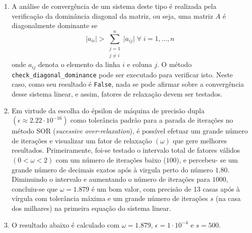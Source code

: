 \documentclass{article}
\newenvironment{arabenum}{
    \begin{enumerate}[label=\textbf{\arabic*})]
}{
    \end{enumerate}
}
\newenvironment{alphenum}{
    \begin{enumerate}[label=(\textit{\alph*})]
}{
    \end{enumerate}
}
\begin{document}
\begin{arabenum}
\begin{alphenum}
\item A análise de convergência de um sistema deste tipo é realizada pela
verificação da dominância diagonal da matriz, ou seja, uma matriz $A$ é
diagonalmente dominante se
\begin{equation*}
\vert a_{ii} \vert > \sum_{\substack{j=1 \\ j \neq i}}^n \vert a_{ij} \vert
\; \forall \; i = 1, \dots, n
\end{equation*}
onde $a_{ij}$ denota o elemento da linha $i$ e coluna $j$. O método
\texttt{check\_diagonal\_dominance} pode ser executado para verificar isto.
Neste caso, como seu resultado é \verb!False!, nada se pode afirmar sobre a
convergência desse sistema linear, e assim, fatores de relaxação devem ser
testados.

\item Em virtude da escolha do épsilon de máquina de precisão dupla $(\epsilon
\approx 2.22 \cdot 10^{-16})$ como tolerância padrão para a parada de iterações
no método SOR (\emph{sucessive over-relaxation}), é possível efetuar um grande
número de iterações e visualizar um fator de relaxação $(\omega)$ que gere
melhores resultados. Primeiramente, foi-se testado o intervalo total de fatores
válidos $(0 < \omega < 2)$ com um número de iterações baixo ($100$), e percebeu-
se um grande número de decimais exatos após à virgula perto do número
$\boldsymbol{1.80}$. Diminuindo o intervalo e aumentando o número de iterações
para $1000$, concluiu-se que $\omega = \boldsymbol{1.879}$ é um bom valor, com
precisão de 13 casas após à vírgula com tolerância máxima e um grande número de
iterações $s$ (na casa dos milhares) na primeira equação do sistema linear.

\item O resultado abaixo é calculado com $\omega = 1.879$,
$\epsilon = 1 \cdot 10^{-4}$ e $s = 500$.


\end{alphenum}
\end{arabenum}
\end{document}
